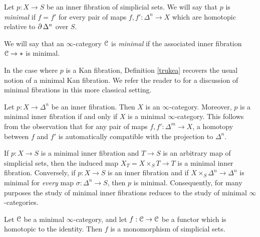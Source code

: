 \begin{definition}\label{trukea}
Let $p: X \rightarrow S$ be an inner fibration of simplicial sets. We will say that $p$ is {\it minimal} if $f=f'$ for every pair of maps $f,f': \Delta^n \rightarrow X$ which are homotopic relative to $\operatorname{\partial} \Delta^n$ over $S$.

We will say that an $\infty$-category $\operatorname{\mathcal{C}}$ is {\it minimal} if the associated inner fibration
$\operatorname{\mathcal{C}} \rightarrow \ast$ is minimal.
\end{definition}

\begin{remark}
In the case where $p$ is a Kan fibration, Definition \ref{trukea} recovers the usual notion of a minimal Kan fibration. We refer the reader to \cite{goerssjardine} for a discussion of minimal fibrations in this more classical setting.
\end{remark}

\begin{remark}
Let $p: X \rightarrow \Delta^n$ be an inner fibration. Then $X$ is an $\infty$-category.
Moreover, $p$ is a minimal inner fibration if and only if $X$ is a minimal $\infty$-category.
This follows from the observation that for any pair of maps $f,f': \Delta^m \rightarrow X$, a homotopy between $f$ and $f'$ is automatically compatible with the projection to $\Delta^n$.
\end{remark}

\begin{remark}
If $p: X \rightarrow S$ is a minimal inner fibration and $T \rightarrow S$ is an arbitrary map of simplicial sets, then the induced map $X_{T} = X \times_{S} T \rightarrow T$ is a minimal inner fibration.
Conversely, if $p: X \rightarrow S$ is an inner fibration and if $X \times_{S} \Delta^n \rightarrow \Delta^n$ is minimal for {\em every} map $\sigma: \Delta^n \rightarrow S$, then $p$ is minimal. Consequently, for many purposes the study of minimal inner fibrations reduces to the study of minimal $\infty$-categories.
\end{remark}

\begin{lemma}\label{ststst}
Let $\operatorname{\mathcal{C}}$ be a minimal $\infty$-category, and let $f: \operatorname{\mathcal{C}} \rightarrow \operatorname{\mathcal{C}}$ be a functor
which is homotopic to the identity. Then $f$ is a monomorphism of simplicial sets.
\end{lemma}

